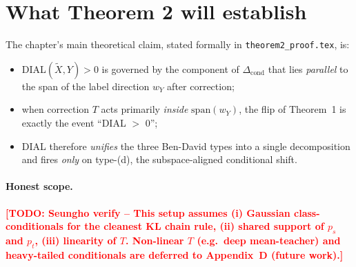 \documentclass[11pt,a4paper]{article}
\newcommand{\TODO}[1]{\textbf{\textcolor{red}{[TODO: Seungho verify -- #1]}}}
\begin{document}
\section{What Theorem 2 will establish}

The chapter's main theoretical claim, stated formally in
\texttt{theorem2\_proof.tex}, is:
\begin{itemize}
\item DIAL$(\tilde X,Y)>0$ is governed by the component of
  $\Delta_{\text{cond}}$ that lies \emph{parallel} to the span of the
  label direction $w_Y$ after correction;
\item when correction $T$ acts primarily \emph{inside}
  $\mathrm{span}(w_Y)$, the flip of Theorem~1 is exactly the event
  ``DIAL $>$ 0'';
\item DIAL therefore \emph{unifies} the three Ben-David types into a
  single decomposition and fires \emph{only} on type-(d), the
  subspace-aligned conditional shift.
\end{itemize}

\paragraph{Honest scope.}
\TODO{This setup assumes (i) Gaussian class-conditionals for the
cleanest KL chain rule, (ii) shared support of $p_s$ and $p_t$, (iii)
linearity of $T$. Non-linear $T$ (e.g.\ deep mean-teacher) and
heavy-tailed conditionals are deferred to Appendix~D (future work).}
\end{document}
